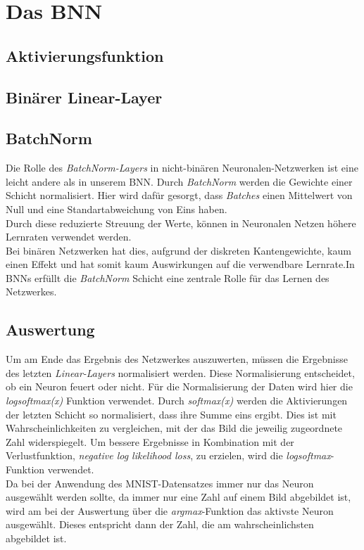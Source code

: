 \chapter{Das BNN}
\section{Aktivierungsfunktion}
\section{Binärer Linear-Layer}
\section{BatchNorm}
Die Rolle des \textit{BatchNorm-Layers} in nicht-binären Neuronalen-Netzwerken ist eine leicht andere als in unserem BNN. Durch \textit{BatchNorm} werden die Gewichte einer Schicht normalisiert. Hier wird dafür gesorgt, dass \textit{Batches} einen Mittelwert von Null und eine Standartabweichung von Eins haben.\\ %
Durch diese reduzierte Streuung der Werte, können in Neuronalen Netzen höhere Lernraten verwendet werden.\\
Bei binären Netzwerken hat dies, aufgrund der diskreten Kantengewichte, kaum einen Effekt und hat somit kaum Auswirkungen auf die verwendbare Lernrate.In BNNs erfüllt die \textit{BatchNorm} Schicht eine zentrale Rolle für das Lernen des Netzwerkes.
\section{Auswertung}
Um am Ende das Ergebnis des Netzwerkes auszuwerten, müssen die Ergebnisse des letzten \textit{Linear-Layers} normalisiert werden. Diese Normalisierung entscheidet, ob ein Neuron feuert oder nicht. Für die Normalisierung der Daten wird hier die \textit{logsoftmax(x)} Funktion verwendet. Durch \textit{softmax(x)} werden die Aktivierungen der letzten Schicht so normalisiert, dass ihre Summe eins ergibt. Dies ist mit Wahrscheinlichkeiten zu vergleichen, mit der das Bild die jeweilig zugeordnete Zahl widerspiegelt. Um bessere Ergebnisse in Kombination mit der Verlustfunktion, \textit{negative log likelihood loss}, zu erzielen, wird die \textit{logsoftmax}-Funktion verwendet.\\
Da bei der Anwendung des MNIST-Datensatzes immer nur das Neuron ausgewählt werden sollte, da immer nur eine Zahl auf einem Bild abgebildet ist, wird am bei der Auswertung über die \textit{argmax}-Funktion das aktivste Neuron ausgewählt. Dieses entspricht dann der Zahl, die am wahrscheinlichsten abgebildet ist.

